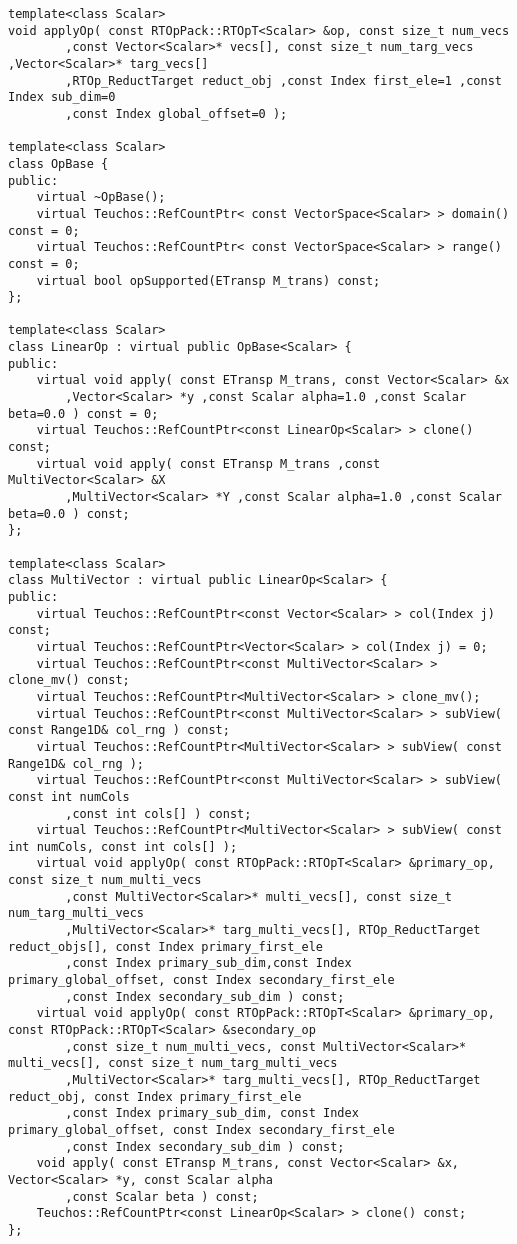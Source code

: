 {\begin{verbatim}
template<class Scalar>
void applyOp( const RTOpPack::RTOpT<Scalar> &op, const size_t num_vecs
        ,const Vector<Scalar>* vecs[], const size_t num_targ_vecs ,Vector<Scalar>* targ_vecs[]
        ,RTOp_ReductTarget reduct_obj ,const Index first_ele=1 ,const Index sub_dim=0
        ,const Index global_offset=0 );

template<class Scalar>
class OpBase {
public:
    virtual ~OpBase();
    virtual Teuchos::RefCountPtr< const VectorSpace<Scalar> > domain() const = 0;
    virtual Teuchos::RefCountPtr< const VectorSpace<Scalar> > range() const = 0;
    virtual bool opSupported(ETransp M_trans) const;
};

template<class Scalar>
class LinearOp : virtual public OpBase<Scalar> {
public:
    virtual void apply( const ETransp M_trans, const Vector<Scalar> &x
        ,Vector<Scalar> *y ,const Scalar alpha=1.0 ,const Scalar beta=0.0 ) const = 0;
    virtual Teuchos::RefCountPtr<const LinearOp<Scalar> > clone() const;
    virtual void apply( const ETransp M_trans ,const MultiVector<Scalar> &X
        ,MultiVector<Scalar> *Y ,const Scalar alpha=1.0 ,const Scalar beta=0.0 ) const;
};

template<class Scalar>
class MultiVector : virtual public LinearOp<Scalar> {
public:
    virtual Teuchos::RefCountPtr<const Vector<Scalar> > col(Index j) const;
    virtual Teuchos::RefCountPtr<Vector<Scalar> > col(Index j) = 0;
    virtual Teuchos::RefCountPtr<const MultiVector<Scalar> > clone_mv() const;
    virtual Teuchos::RefCountPtr<MultiVector<Scalar> > clone_mv();
    virtual Teuchos::RefCountPtr<const MultiVector<Scalar> > subView( const Range1D& col_rng ) const;
    virtual Teuchos::RefCountPtr<MultiVector<Scalar> > subView( const Range1D& col_rng );
    virtual Teuchos::RefCountPtr<const MultiVector<Scalar> > subView( const int numCols
        ,const int cols[] ) const;
    virtual Teuchos::RefCountPtr<MultiVector<Scalar> > subView( const int numCols, const int cols[] );
    virtual void applyOp( const RTOpPack::RTOpT<Scalar> &primary_op, const size_t num_multi_vecs
        ,const MultiVector<Scalar>* multi_vecs[], const size_t num_targ_multi_vecs
        ,MultiVector<Scalar>* targ_multi_vecs[], RTOp_ReductTarget reduct_objs[], const Index primary_first_ele
        ,const Index primary_sub_dim,const Index primary_global_offset, const Index secondary_first_ele
        ,const Index secondary_sub_dim ) const;
    virtual void applyOp( const RTOpPack::RTOpT<Scalar> &primary_op, const RTOpPack::RTOpT<Scalar> &secondary_op
        ,const size_t num_multi_vecs, const MultiVector<Scalar>* multi_vecs[], const size_t num_targ_multi_vecs
        ,MultiVector<Scalar>* targ_multi_vecs[], RTOp_ReductTarget reduct_obj, const Index primary_first_ele
        ,const Index primary_sub_dim, const Index primary_global_offset, const Index secondary_first_ele
        ,const Index secondary_sub_dim ) const;
    void apply( const ETransp M_trans, const Vector<Scalar> &x, Vector<Scalar> *y, const Scalar alpha
        ,const Scalar beta ) const;
    Teuchos::RefCountPtr<const LinearOp<Scalar> > clone() const;
};


\end{verbatim}}

